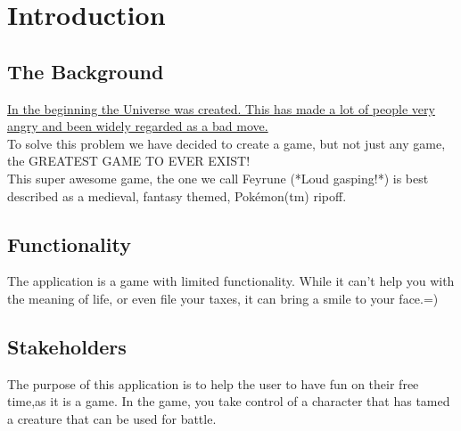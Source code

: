 \section{Introduction}

\begin{comment}
Give some background and explain the purpose of this application. Describe
the functionality of the application. Describe the stakeholders of the project,
highlight who will benefit from/use this particular application.
\end{comment}
\subsection{The Background}
\href{https://www.amazon.com/Restaurant-at-End-Universe/dp/0345391810}{
	In the beginning the Universe was created. This has made a lot of people very angry and been widely regarded as a bad move.}\\
To solve this problem we have decided to create a game, but not just any game, the GREATEST GAME TO EVER EXIST!\\
This super awesome game, the one we call Feyrune (*Loud gasping!*) is best described as a medieval, fantasy themed, Pokémon(tm) ripoff.\\

\subsection{Functionality}
The application is a game with limited functionality. While it can't help you with the meaning of life, or even file your taxes, it can bring a smile to your face.=)

\subsection{Stakeholders}


The purpose of this application is to help the user to have fun on their free time,as it is a game. In the game, you take control of a character that has tamed a creature that can be used for battle.



